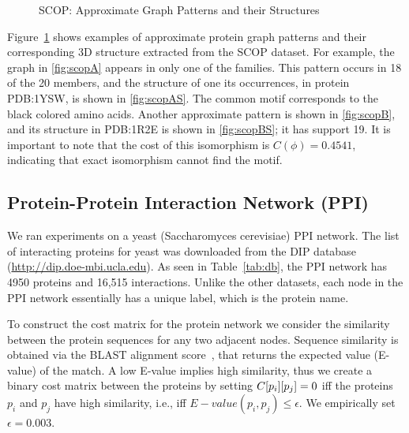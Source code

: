 \begin{figure}[!ht]
  \centerline{
	}
	\centerline{
	}
	\caption{SCOP: Approximate Graph Patterns and their Structures}
	\label{fig:scoppats}
\end{figure}


\smallskip{}
Figure~\ref{fig:scoppats} shows examples of approximate protein graph
patterns and their corresponding 3D structure extracted from the SCOP
dataset.  For example, the graph in \ref{fig:scopA} appears in only one of
the families. This pattern occurs in 18 of the 20 members, and the
structure of one its occurrences, in protein PDB:1YSW, is shown in
\ref{fig:scopAS}. The common motif corresponds to the black colored
amino acids.  Another approximate pattern is shown in \ref{fig:scopB},
and its structure in PDB:1R2E is shown in \ref{fig:scopBS}; it has
support 19.  It is important to note that the cost of this isomorphism
is $C(\phi) = 0.4541$, indicating that exact isomorphism cannot find the
motif.

\subsection{Protein-Protein Interaction Network (PPI)} We ran
experiments on a yeast (Saccharomyces cerevisiae) PPI network. The list of
interacting proteins for yeast was downloaded from the DIP database
(\url{http://dip.doe-mbi.ucla.edu}). As seen in Table~\ref{tab:db}, the
PPI network has 4950 proteins and 16,515 interactions.  Unlike the other
datasets, each node in the PPI network essentially has a unique label,
which is the protein name.  

\smallskip{} 
To construct the cost matrix for the protein network we consider the
similarity between the protein sequences for any two adjacent nodes.
Sequence similarity is obtained via the BLAST alignment
score~\cite{altschul90}, that returns the expected value (E-value) of
the match. A low E-value implies high similarity, thus we create a
binary cost matrix between the proteins by setting
${C}[p_i][p_j] =0$ iff the proteins $p_i$ and $p_j$ have high
similarity, i.e., iff $E-value(p_i, p_j) \le \epsilon$. We empirically 
set $\epsilon = 0.003$.


